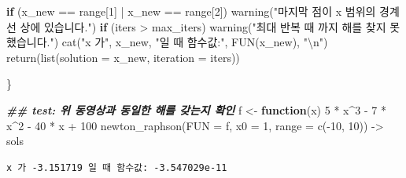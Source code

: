 \documentclass[
  11pt,
]{krantz}
\newenvironment{Shaded}{\begin{snugshade}}{\end{snugshade}}
\newcommand{\AttributeTok}[1]{\textcolor[rgb]{0.61,0.61,0.61}{#1}}
\newcommand{\ControlFlowTok}[1]{\textcolor[rgb]{0.27,0.27,0.27}{\textbf{#1}}}
\newcommand{\DecValTok}[1]{\textcolor[rgb]{0.06,0.06,0.06}{#1}}
\newcommand{\DocumentationTok}[1]{\textcolor[rgb]{0.37,0.37,0.37}{\textbf{\textit{#1}}}}
\newcommand{\FunctionTok}[1]{\textcolor[rgb]{0,0,0}{#1}}
\newcommand{\NormalTok}[1]{#1}
\newcommand{\OtherTok}[1]{\textcolor[rgb]{0.37,0.37,0.37}{#1}}
\newcommand{\SpecialCharTok}[1]{\textcolor[rgb]{0,0,0}{#1}}
\newcommand{\StringTok}[1]{\textcolor[rgb]{0.5,0.5,0.5}{#1}}
\begin{document}
\begin{Shaded}
\begin{Highlighting}[]
 \ControlFlowTok{if}\NormalTok{ (x\_new }\SpecialCharTok{==}\NormalTok{ range[}\DecValTok{1}\NormalTok{] }\SpecialCharTok{|}\NormalTok{ x\_new }\SpecialCharTok{==}\NormalTok{ range[}\DecValTok{2}\NormalTok{]) }
   \FunctionTok{warning}\NormalTok{(}\StringTok{"마지막 점이 x 범위의 경계선 상에 있습니다."}\NormalTok{)}
 \ControlFlowTok{if}\NormalTok{ (iters }\SpecialCharTok{\textgreater{}}\NormalTok{ max\_iters) }
   \FunctionTok{warning}\NormalTok{(}\StringTok{"최대 반복 때 까지 해를 찾지 못했습니다."}\NormalTok{)}
 \FunctionTok{cat}\NormalTok{(}\StringTok{"x 가"}\NormalTok{, x\_new, }\StringTok{"일 때 함수값:"}\NormalTok{, }\FunctionTok{FUN}\NormalTok{(x\_new), }\StringTok{"}\SpecialCharTok{\textbackslash{}n}\StringTok{"}\NormalTok{)}
 \FunctionTok{return}\NormalTok{(}\FunctionTok{list}\NormalTok{(}\AttributeTok{solution =}\NormalTok{ x\_new, }\AttributeTok{iteration =}\NormalTok{ iters))}
 
\NormalTok{\}}

\DocumentationTok{\#\# test: 위 동영상과 동일한 해를 갖는지 확인}
\NormalTok{f }\OtherTok{\textless{}{-}} \ControlFlowTok{function}\NormalTok{(x) }\DecValTok{5} \SpecialCharTok{*}\NormalTok{ x}\SpecialCharTok{\^{}}\DecValTok{3} \SpecialCharTok{{-}} \DecValTok{7} \SpecialCharTok{*}\NormalTok{ x}\SpecialCharTok{\^{}}\DecValTok{2} \SpecialCharTok{{-}} \DecValTok{40} \SpecialCharTok{*}\NormalTok{ x }\SpecialCharTok{+} \DecValTok{100} 
\FunctionTok{newton\_raphson}\NormalTok{(}\AttributeTok{FUN =}\NormalTok{ f, }
               \AttributeTok{x0 =} \DecValTok{1}\NormalTok{,}
               \AttributeTok{range =} \FunctionTok{c}\NormalTok{(}\SpecialCharTok{{-}}\DecValTok{10}\NormalTok{, }\DecValTok{10}\NormalTok{)) }\OtherTok{{-}\textgreater{}}\NormalTok{ sols}
\end{Highlighting}
\end{Shaded}

\begin{verbatim}
x 가 -3.151719 일 때 함수값: -3.547029e-11 
\end{verbatim}

\normalsize

  

\printindex
\end{document}
